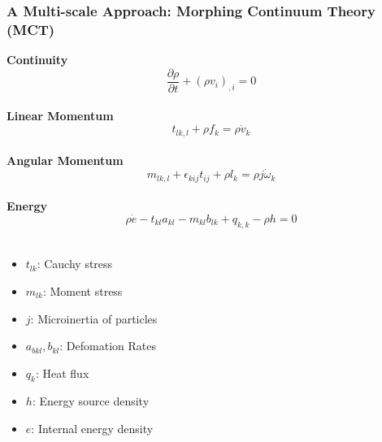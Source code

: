 \documentclass{beamer}
\begin{document}
\begin{frame}
\frametitle{A Multi-scale Approach: Morphing Continuum Theory (MCT)}
\centering
\begin{multicols}{2}
\textbf{Continuity}
$$\frac{\partial \rho}{\partial t} + (\rho v_{i})_{,i} = 0$$\\
\textbf{Linear Momentum}
$$t_{lk,l} + \rho f_{k} =  \rho {\dot{v}}_{ k} $$\\
\textbf{Angular Momentum}
$$ m_{lk,l} + \epsilon_{kij}t_{ij} + \rho l_{k} = \rho j\dot{\omega}_{ k}$$\\
\textbf{Energy}
$$\rho \dot{e} - t_{kl}a_{kl} - m_{kl}b_{lk} + q_{k,k} - \rho h = 0$$\\
\end{multicols}
\begin{multicols}{2}
\begin{itemize}
\item $t_{lk}$: Cauchy stress 
\item $m_{lk}$: Moment stress 
\item $j$: Microinertia of particles
\item $a_{bkl}, b_{kl}$: Defomation Rates
\item $q_{k}$: Heat flux
\item $h$: Energy source density
\item $e$: Internal energy density
\end{itemize}
\end{multicols}
\end{frame}
\end{document}
